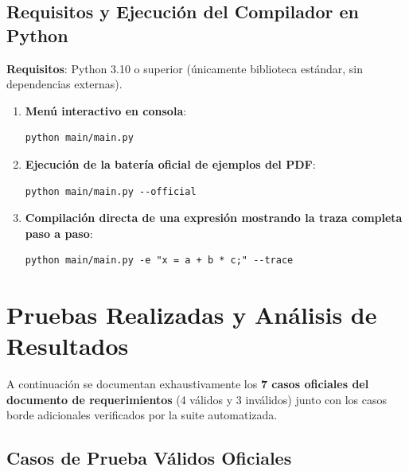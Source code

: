 \documentclass[11pt, letterpaper]{article}
\begin{document}
\subsection{Requisitos y Ejecución del Compilador en Python}
\textbf{Requisitos}: Python 3.10 o superior (únicamente biblioteca estándar, sin dependencias externas).

\begin{enumerate}[leftmargin=1.8em]
    \item \textbf{Menú interactivo en consola}:
\begin{lstlisting}[numbers=none]
python main/main.py
\end{lstlisting}
    \item \textbf{Ejecución de la batería oficial de ejemplos del PDF}:
\begin{lstlisting}[numbers=none]
python main/main.py --official
\end{lstlisting}
    \item \textbf{Compilación directa de una expresión mostrando la traza completa paso a paso}:
\begin{lstlisting}[numbers=none]
python main/main.py -e "x = a + b * c;" --trace
\end{lstlisting}
\end{enumerate}

\section{Pruebas Realizadas y Análisis de Resultados}

A continuación se documentan exhaustivamente los \textbf{7 casos oficiales del documento de requerimientos} (4 válidos y 3 inválidos) junto con los casos borde adicionales verificados por la suite automatizada.

\subsection{Casos de Prueba Válidos Oficiales}

\end{document}

